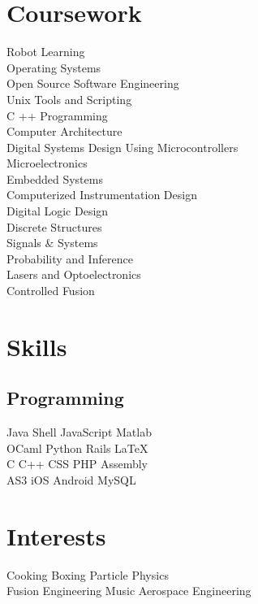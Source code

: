 \documentclass[]{deedy-resume-openfont}
\begin{document}
\begin{minipage}[t]{0.33\textwidth}
    \section{Coursework}
        Robot Learning\\
        Operating Systems \\
        Open Source Software Engineering \\
        Unix Tools and Scripting \\
        C ++ Programming\\
        Computer Architecture\\
        Digital Systems Design Using Microcontrollers\\
        Microelectronics\\
        Embedded Systems\\
        Computerized Instrumentation Design\\
        Digital Logic Design\\
        Discrete Structures\\
        Signals \& Systems\\
        Probability and Inference\\
        Lasers and Optoelectronics\\
        Controlled Fusion\\
    \sectionsep

    \section{Skills}
        \subsection{Programming}
            Java \textbullet{}
            Shell \textbullet{}
            JavaScript \textbullet{}
            Matlab \\
            OCaml \textbullet{}
            Python \textbullet{}
            Rails \textbullet{}
            \LaTeX\ \\
            C \textbullet{}
            C++ \textbullet{}
            CSS \textbullet{}
            PHP \textbullet{}
            Assembly \\
            AS3 \textbullet{}
            iOS \textbullet{}
            Android \textbullet{}
            MySQL
    \sectionsep

    \section{Interests}
        Cooking \textbullet{}
        Boxing \textbullet{}
        Particle Physics \\
        Fusion Engineering \textbullet{}
        Music \textbullet{}
        Aerospace Engineering
    \sectionsep

\end{minipage}
\end{document}

